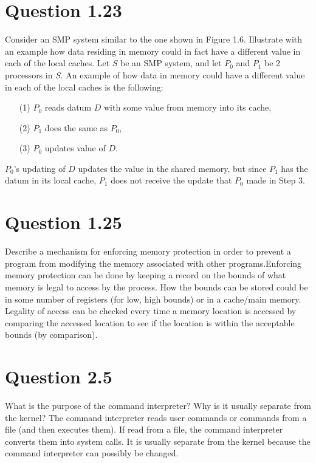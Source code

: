 \documentclass[12pt]{article}
\begin{document}
\section*{Question 1.23} {\color{blue}Consider an SMP system similar to the one shown in Figure 1.6. Illustrate with an example how data residing in memory could in fact have a different value in each of the local caches.} Let $S$ be an SMP system, and let $P_{0}$ and $P_{1}$ be 2 processors in $S$. An example of how data in memory could have a different value in each of the local caches is the following: 
\begin{enumerate}
\item[(1)]$P_{0}$ reads datum $D$ with some value from memory into its cache, 
\item[(2)]$P_{1}$ does the same as $P_{0}$,
\item[(3)]$P_{0}$ updates value of $D$. 
\end{enumerate}
$P_{0}$'s updating of $D$ updates the value in the shared memory, but since $P_{1}$ has the datum in its local cache, $P_{1}$ does not receive the update that $P_{0}$ made in Step 3.

\section*{Question 1.25} {\color{blue}Describe a mechanism for enforcing memory protection in order to prevent a program from modifying the memory associated with other programs.}Enforcing memory protection can be done by keeping a record on the bounds of what memory is legal to access by the process. How the bounds can be stored could be in some number of registers (for low, high bounds) or in a cache/main memory. Legality of access can be checked every time a memory location is accessed by comparing the accessed location to see if the location is within the acceptable bounds (by comparison).

\section*{Question 2.5} {\color{blue}What is the purpose of the command interpreter? Why is it usually separate from the kernel?} The command interpreter reads user commands or commands from a file (and then executes them). If read from a file, the command interpreter converts them into system calls. It is usually separate from the kernel because the command interpreter can possibly be changed.
\end{document}
